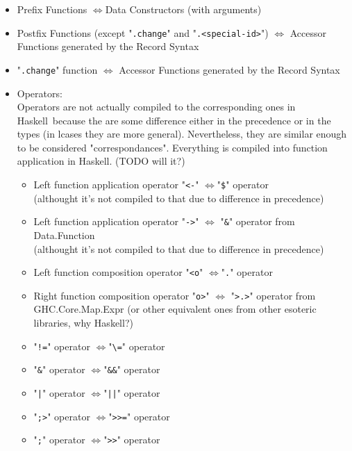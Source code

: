 \documentclass{article}
\def\H{Haskell}
\def\r{$\Longleftrightarrow$}
\begin{document}
\begin{itemize}
\item
Prefix Functions \r Data Constructors (with arguments)
\item
Postfix Functions (except "\verb|.change|" and "\verb|.<special-id>|")
\r
Accessor Functions generated by the Record Syntax
\item
"\verb|.change|" function
\r
Accessor Functions generated by the Record Syntax
\item
Operators:
\\
Operators are not actually compiled to the corresponding ones in \H\ because
the are some difference either in the precedence or in the types (in lcases
they are more general). Nevertheless, they are similar enough to be considered
"correspondances". Everything is compiled into function application in \H.
(TODO will it?)
\begin{itemize}
\item
Left function application operator "\verb|<-|" \r "\verb|$|" operator
\\
(althought it's not compiled to that due to difference in precedence)

\item
Left function application operator "\verb|->|" \r
"\verb|&|" operator from Data.Function
\\
(althought it's not compiled to that due to difference in precedence)

\item
Left function composition operator "\verb|<o|" \r "\verb|.|" operator

\item
Right function composition operator "\verb|o>|" \r
"\verb|>.>|" operator from GHC.Core.Map.Expr (or other equivalent ones from
other esoteric libraries, why \H?)

\item
"\verb|!=|" operator \r "\verb|\=|" operator

\item
"\verb|&|" operator \r "\verb|&&|" operator

\item
"\texttt{|}" operator \r "\texttt{||}" operator

\item
"\verb|;>|" operator \r "\verb|>>=|" operator

\item
"\verb|;|" operator \r "\verb|>>|" operator

\end{itemize}


\end{itemize}
\end{document}
